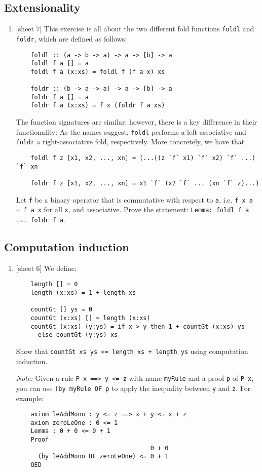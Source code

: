 \documentclass{article}
\def\code#1{\texttt{#1}}
\begin{document}
\subsection{Extensionality}
\begin{enumerate}
    \item {[sheet 7]} This exercise is all about the two different fold functions \code{foldl} and \code{foldr}, which are defined as follows:
        \begin{verbatim}
    foldl :: (a -> b -> a) -> a -> [b] -> a
    foldl f a [] = a
    foldl f a (x:xs) = foldl f (f a x) xs

    foldr :: (b -> a -> a) -> a -> [b] -> a
    foldr f a [] = a
    foldr f a (x:xs) = f x (foldr f a xs)
        \end{verbatim}
        The function signatures are similar; however, there is a key difference in their functionality: As the names suggest, \code{foldl} performs a left-associative and \code{foldr} a right-associative fold, respectively. More concretely, we have that
        \begin{verbatim}
    foldl f z [x1, x2, ..., xn] = (...((z `f` x1) `f` x2) `f` ...) `f` xn

    foldr f z [x1, x2, ..., xn] = x1 `f` (x2 `f` ... (xn `f` z)...)
        \end{verbatim}
        Let \code{f} be a binary operator that is commutative with respect to \code{a}, i.e. \code{f x a = f a x} for all \code{x}, and associative. Prove the statement: \code{Lemma: foldl f a .=. foldr f a}.
\end{enumerate}

\subsection{Computation induction}
\begin{enumerate}
    \item {[sheet 6]} We define:
        \begin{verbatim}
    length [] = 0
    length (x:xs) = 1 + length xs

    countGt [] ys = 0
    countGt (x:xs) [] = length (x:xs)
    countGt (x:xs) (y:ys) = if x > y then 1 + countGt (x:xs) ys
      else countGt (y:ys) xs
        \end{verbatim}
        Show that \code{countGt xs ys <= length xs + length ys} using computation induction. \par
        \textit{Note:} Given a rule \code{P x ==> y <= z} with name \code{myRule} and a proof \code{p} of \code{P x}, you can use \code{(by myRule OF p} to apply the inequality between \code{y} and \code{z}. For example:
        \begin{verbatim}
    axiom leAddMono : y <= z ==> x + y <= x + z
    axiom zeroLeOne : 0 <= 1
    Lemma : 0 + 0 <= 0 + 1
    Proof
                                     0 + 0
      (by leAddMono OF zeroLeOne) <= 0 + 1
    QED
        \end{verbatim}
\end{enumerate}
\end{document}
